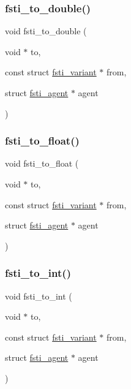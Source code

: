 \mbox{\label{fsti-events_8h_a89b0fd0e286b354aa15c5e5bbfc50bcb}} 
\subsubsection{\texorpdfstring{fsti\+\_\+to\+\_\+double()}{fsti\_to\_double()}}
{\footnotesize\ttfamily void fsti\+\_\+to\+\_\+double (\begin{DoxyParamCaption}\item[{void $\ast$}]{to,  }\item[{const struct \mbox{\hyperlink{structfsti__variant}{fsti\+\_\+variant}} $\ast$}]{from,  }\item[{struct \mbox{\hyperlink{structfsti__agent}{fsti\+\_\+agent}} $\ast$}]{agent }\end{DoxyParamCaption})}

\mbox{\label{fsti-events_8h_af4a768af0f5d827f7b40da95c29879da}} 
\subsubsection{\texorpdfstring{fsti\+\_\+to\+\_\+float()}{fsti\_to\_float()}}
{\footnotesize\ttfamily void fsti\+\_\+to\+\_\+float (\begin{DoxyParamCaption}\item[{void $\ast$}]{to,  }\item[{const struct \mbox{\hyperlink{structfsti__variant}{fsti\+\_\+variant}} $\ast$}]{from,  }\item[{struct \mbox{\hyperlink{structfsti__agent}{fsti\+\_\+agent}} $\ast$}]{agent }\end{DoxyParamCaption})}

\mbox{\label{fsti-events_8h_ae5bb2a1c874126eca3ed12115e22360a}} 
\subsubsection{\texorpdfstring{fsti\+\_\+to\+\_\+int()}{fsti\_to\_int()}}
{\footnotesize\ttfamily void fsti\+\_\+to\+\_\+int (\begin{DoxyParamCaption}\item[{void $\ast$}]{to,  }\item[{const struct \mbox{\hyperlink{structfsti__variant}{fsti\+\_\+variant}} $\ast$}]{from,  }\item[{struct \mbox{\hyperlink{structfsti__agent}{fsti\+\_\+agent}} $\ast$}]{agent }\end{DoxyParamCaption})}

